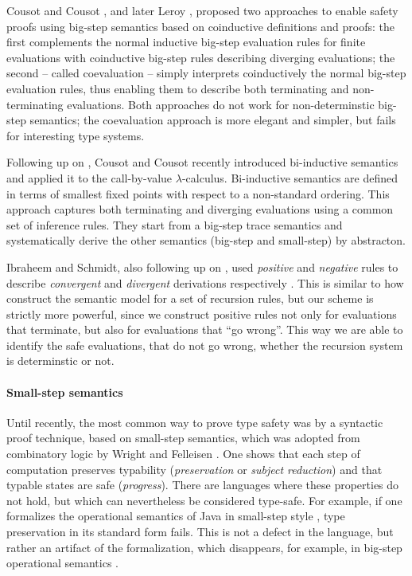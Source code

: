 \documentclass[a4paper,final,preprint,sort&compress]{elsarticle}
\begin{document}
Cousot and Cousot \cite{CousotCousot92}, and later Leroy \ETAL \cite{LeroyGrall09},
proposed two approaches to enable safety proofs using big-step semantics based on
coinductive definitions and proofs: the first complements the normal inductive big-step
evaluation rules for finite evaluations with coinductive big-step rules describing diverging
evaluations; the second -- called coevaluation -- simply interprets coinductively the normal
big-step evaluation rules, thus enabling them to describe both terminating and non-terminating
evaluations.
Both approaches do not work for non-determinstic big-step semantics; the
coevaluation approach is more elegant and simpler, but fails for interesting type systems.

Following up on \cite{CousotCousot92}, Cousot and Cousot recently introduced bi-inductive
semantics \cite{CousotCousot07} and applied it to the call-by-value $\lambda$-calculus.
Bi-inductive semantics are defined in terms of smallest fixed points with respect to a
non-standard ordering. This approach captures both terminating and diverging evaluations
using a common set of inference rules. They start from a big-step trace semantics and
systematically derive the other semantics (big-step and small-step) by abstracton.

Ibraheem and Schmidt, also following up on \cite{CousotCousot92}, used \emph{positive} and
\emph{negative} rules to describe \emph{convergent} and \emph{divergent} derivations respectively
\cite{IbraheemSchmidt98}. This is similar to how construct the semantic model for
a set of recursion rules, but our scheme is strictly more powerful, since we construct positive
rules not only for evaluations that terminate, but also for evaluations that ``go wrong''. This
way we are able to identify the safe evaluations, that do not go wrong, whether the recursion
system is determinstic or not.


\paragraph{Small-step semantics}

Until recently, the most common way to prove type safety was by a syntactic proof
technique, based on small-step semantics, which was adopted from combinatory
logic by Wright and Felleisen \cite{WrightFelleisen94}. One shows that each step of
computation preserves typability (\emph{preservation} or \emph{subject reduction})
and that typable states are safe (\emph{progress}). There are
languages where these properties do not hold, but which can nevertheless be
considered type-safe. For example, if one formalizes the operational semantics
of Java in small-step style \cite{FlattKrishnamurthiFelleisen98,IgarashiPierceWadler01},
type preservation in its standard form fails. This is
not a defect in the language, but rather an artifact of the formalization, which
disappears, for example, in big-step operational semantics \cite{Pierce02}.
\end{document}
